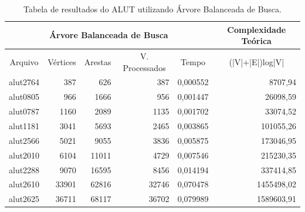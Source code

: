 \documentclass[
	12pt,				%
	oneside,			%
	a4paper,			%
	english,			%
	french,				%
	spanish,			%
	brazil,				%
	]{abntex2}
\begin{document}
\begin{table}[H]
  \centering    
  \begin{tabular}{|c|r|r|r|r|r|}
    \toprule
    \multicolumn{5}{|c|}{\cellcolor{gray!25}\textbf{Árvore Balanceada de Busca}} & \multicolumn{1}{|c|}{\cellcolor{gray!25}\textbf{Complexidade Teórica}}\\
    \midrule
    \multicolumn{1}{|c|}{\cellcolor{gray!10}Arquivo} & \multicolumn{1}{|c|}{\cellcolor{gray!10}Vértices} & \multicolumn{1}{|c|}{\cellcolor{gray!10}Arestas} & \multicolumn{1}{|c|}{\cellcolor{gray!10}V. Processados} & \multicolumn{1}{|c|}{\cellcolor{gray!10}Tempo} & \multicolumn{1}{|c|}{\cellcolor{gray!10}(|V|+|E|)log|V|}\\
    \hline
    alut2764	&	387	&	626	&	387	&	0,000552	&	8707,94	\\
    \hline
    alut0805	&	966	&	1666	&	956	&	0,001447	&	26098,59	\\
    \hline
    alut0787	&	1160	&	2089	&	1135	&	0,001702	&	33074,52	\\
    \hline
    alut1181	&	3041	&	5693	&	2465	&	0,003865	&	101055,26	\\
    \hline
    alut2566	&	5021	&	9055	&	3836	&	0,005875	&	173046,95	\\
    \hline
    alut2010	&	6104	&	11011	&	4729	&	0,007546	&	215230,35	\\
    \hline
    alut2288	&	9070	&	16595	&	8456	&	0,014194	&	337414,85	\\
    \hline
    alut2610	&	33901	&	62816	&	32746	&	0,070478	&	1455498,02	\\
    \hline
    alut2625	&	36711	&	68117	&	36702	&	0,079989	&	1589603,91	\\
    \hline
  \end{tabular}
  \caption{Tabela de resultados do ALUT utilizando Árvore Balanceada de Busca.}  
  \label{tab:AlutArvore}
\end{table}
\end{document}
